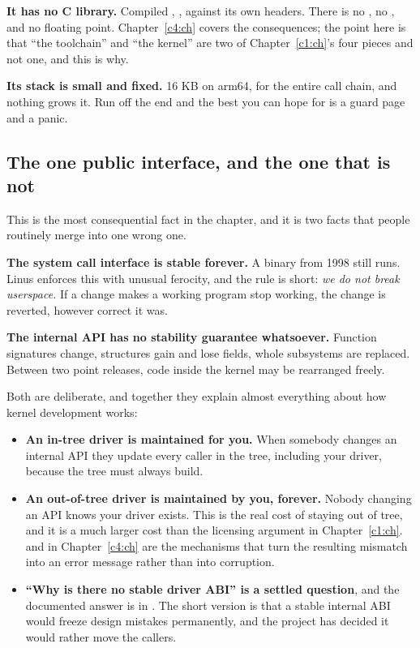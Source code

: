 \textbf{It has no C library.} Compiled , , against its own
headers. There is no , no , and no floating point. Chapter~\ref{c4:ch}
covers the consequences; the point here is that ``the toolchain'' and ``the kernel'' are two of
Chapter~\ref{c1:ch}'s four pieces and not one, and this is why.

\textbf{Its stack is small and fixed.} 16 KB on arm64, for the entire call chain, and nothing grows
it. Run off the end and the best you can hope for is a guard page and a panic.

\subsection{The one public interface, and the one that is not}
\label{c3:app:a2}

This is the most consequential fact in the chapter, and it is two facts that people routinely merge
into one wrong one.

\textbf{The system call interface is stable forever.} A binary from 1998 still runs. Linus enforces this with unusual ferocity, and the rule is short: \emph{we do not break
userspace.} If a change makes a working program stop working, the change is reverted, however
correct it was.

\textbf{The internal API has no stability guarantee whatsoever.} Function signatures change,
structures gain and lose fields, whole subsystems are replaced. Between two point releases, code
inside the kernel may be rearranged freely.

Both are deliberate, and together they explain almost everything about how kernel development works:
\begin{itemize}
  \item \textbf{An in-tree driver is maintained for you.} When somebody changes an internal API they
    update every caller in the tree, including your driver, because the tree must always build.
  \item \textbf{An out-of-tree driver is maintained by you, forever.} Nobody changing an API knows
    your driver exists. This is the real cost of staying out of tree, and it is a much larger cost
    than the licensing argument in Chapter~\ref{c1:ch}.  and
     in Chapter~\ref{c4:ch} are the mechanisms that turn the resulting
    mismatch into an error message rather than into corruption.
  \item \textbf{``Why is there no stable driver ABI'' is a settled question}, and the documented
    answer is in . The short version is that a
    stable internal ABI would freeze design mistakes permanently, and the project has decided it
    would rather move the callers.
\end{itemize}

